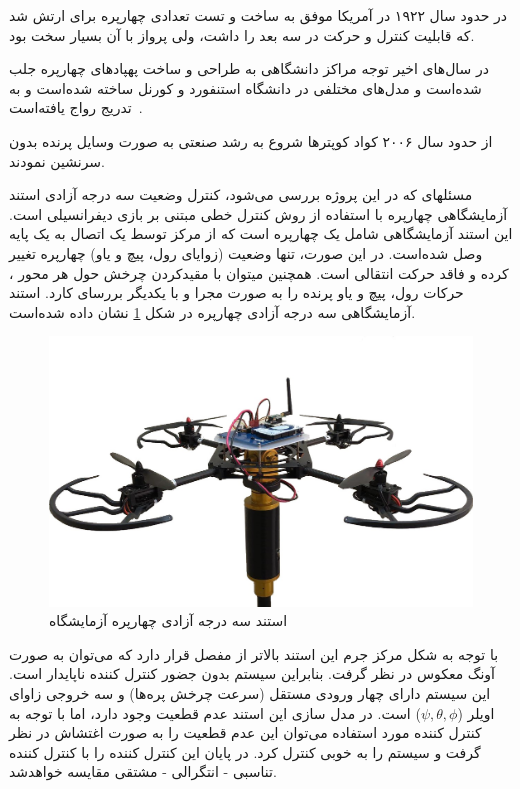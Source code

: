 در حدود سال ۱۹۲۲ در آمریکا  موفق به ساخت و تست تعدادی چهارپره برای ارتش شد که قابلیت کنترل و حرکت در سه بعد را داشت، ولی پرواز با آن بسیار سخت بود.

در سال‌های اخیر توجه مراکز دانشگاهی به طراحی و ساخت پهپادهای چهارپره جلب شده‌است و مدل‌های مختلفی در دانشگاه استنفورد و کورنل ساخته شده‌است و به تدریج رواج یافته‌است~\cite{5717652}.

از حدود سال ۲۰۰۶ کواد کوپترها شروع به رشد صنعتی به صورت وسایل پرنده بدون سرنشین نمودند.


مسئلهای که در این پروژه بررسی می‌شود، کنترل وضعیت سه درجه آزادی استند آزمایشگاهی چهارپره با استفاده از روش کنترل خطی مبتنی بر بازی دیفرانسیلی است. این استند آزمایشگاهی شامل یک چهارپره است که از 
مرکز توسط یک اتصال به یک پایه وصل شده‌است. در این صورت، تنها وضعیت (زوایای رول، پیچ و یاو) 
چهارپره تغییر کرده و فاقد حرکت انتقالی است. همچنین میتوان با مقیدکردن چرخش حول هر محور ، 
حرکات رول، پیچ و یاو پرنده را به صورت مجرا و با یکدیگر بررسای کارد.
استند آزمایشگاهی سه درجه آزادی چهارپره در شکل \ref{LabQuad} نشان داده شده‌است.

\begin{figure}[H]\label{LabQuad}
	\includegraphics[width=12cm]{figs/introduction/3DOFQuad.jpg}
	\centering
	\caption{استند سه درجه آزادی چهارپره آزمایشگاه\cite{Iranlabexpo}}
\end{figure}
با توجه به شکل مرکز جرم این استند بالاتر از مفصل قرار دارد که می‌توان به صورت آونگ معکوس در نظر گرفت. بنابراین سیستم بدون جضور کنترل کننده ناپایدار است. این سیستم دارای چهار ورودی مستقل (سرعت چرخش پره‌ها) و سه خروجی زاوای اویلر ($\psi, \theta, \phi$) است. در مدل سازی این استند عدم قطعیت وجود دارد، اما با توجه به کنترل کننده مورد استفاده می‌توان این عدم قطعیت را به صورت اغتشاش در نظر گرفت و سیستم را به خوبی کنترل کرد. در پایان این کنترل کننده را با کنترل کننده تناسبی - انتگرالی -
مشتقی مقایسه خواهد‌شد.




